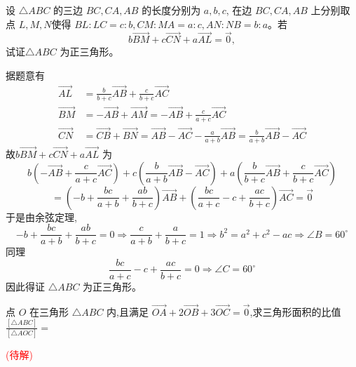 \begin{questions}
    \question 设 $\triangle ABC$ 的三边 $BC,CA,AB$ 的长度分别为 $a,b,c$, 在边 $BC,CA,AB$ 上分别取点 $L,M,N$使得 $BL:LC=c:b,CM:MA=a:c,AN:NB=b:a$。若 
    \[
    b\overrightarrow{BM}+c\overrightarrow{CN}+a\overrightarrow{AL}=\vec{0},
    \]
    试证$\triangle ABC$ 为正三角形。
    \begin{solution}
        据题意有
        \begin{align*}
        \overrightarrow{AL}&=\frac{b}{b+c}\overrightarrow{AB}+\frac{c}{b+c}\overrightarrow{AC} \\[1mm]
        \overrightarrow{BM}&=-\overrightarrow{AB}+\overrightarrow{AM}
        =-\overrightarrow{AB}+\frac{c}{a+c}\overrightarrow{AC} \\
        \overrightarrow{CN}
        &=\overrightarrow{CB}+\overrightarrow{BN}
        =\overrightarrow{AB}-\overrightarrow{AC}-\frac{a}{a+b}\overrightarrow{AB}
        =\frac{b}{a+b}\overrightarrow{AB}-\overrightarrow{AC}
        \end{align*}
        故$b\overrightarrow{BM}+c\overrightarrow{CN}+a\overrightarrow{AL}$ 为
        \[
        b\left(-\overrightarrow{AB}+\frac{c}{a+c}\overrightarrow{AC}\right)
        +c\left(\frac{b}{a+b}\overrightarrow{AB}-\overrightarrow{AC}\right)
        +a\left(\frac{b}{b+c}\overrightarrow{AB}+\frac{c}{b+c}\overrightarrow{AC}\right)
        \]
        \[
        =\left(-b+\frac{bc}{a+b}+\frac{ab}{b+c}\right)\overrightarrow{AB}
        +\left(\frac{bc}{a+c}-c+\frac{ac}{b+c}\right)\overrightarrow{AC}=\overrightarrow{0}
        \]
        于是由余弦定理,
        \[
        -b+\frac{bc}{a+b}+\frac{ab}{b+c}=0
        \Rightarrow \frac{c}{a+b}+\frac{a}{b+c}=1
        \Rightarrow b^2=a^2+c^2-ac
        \Rightarrow \angle B=60^\circ
        \]
        同理
        \[
        \frac{bc}{a+c}-c+\frac{ac}{b+c}=0
        \Rightarrow \angle C=60^\circ
        \]
        因此得证 $\triangle ABC$ 为正三角形。
    \end{solution}

    \question 点 \(O\) 在三角形 \(\triangle ABC\) 内,且满足 $\overrightarrow{OA} + 2\overrightarrow{OB} + 3\overrightarrow{OC} = \overrightarrow{0}$,求三角形面积的比值 $\frac{[\triangle ABC]}{[\triangle AOC]} =$ 
    \begin{solution}
        \textcolor{red}{(待解)}
    \end{solution}


\end{questions}
